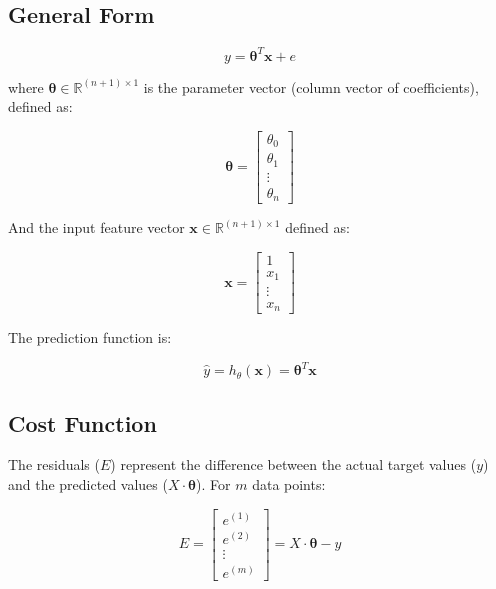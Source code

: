 \subsection{General Form}

\begin{equation}
    y = \boldsymbol{\theta}^T \mathbf{x} + e
\end{equation}

where $ \boldsymbol{\theta} \in \mathbb{R}^{(n+1) \times 1}$ is the parameter vector (column vector of coefficients), defined as:

\begin{equation}
    \boldsymbol{\theta} =
     \begin{bmatrix}
     \theta_0 \\
     \theta_1 \\
     \vdots \\
     \theta_n
     \end{bmatrix}
\end{equation}

And the input feature vector $\mathbf{x} \in \mathbb{R}^{(n+1) \times 1}$  defined as:

\begin{equation}
    \mathbf{x} = \begin{bmatrix}
                     1 \\
                    x_1 \\
                    \vdots \\
                    x_n
    \end{bmatrix}
\end{equation}

The prediction function is:

\begin{equation}
    \hat{y} = h_\theta(\mathbf{x}) = \boldsymbol{\theta}^T \mathbf{x}
\end{equation}

\subsection{Cost Function}

The residuals (\(E\)) represent the difference between the actual target values (\(y\)) and the
predicted values (\(X \cdot \boldsymbol{\theta}\)). For \(m\) data points:

\begin{equation}
    E = \begin{bmatrix}
    e^{(1)} \\
    e^{(2)} \\
    \vdots \\
    e^{(m)}
    \end{bmatrix}
    = X \cdot \boldsymbol{\theta} - y
\end{equation}

